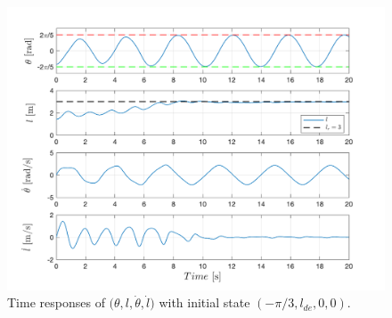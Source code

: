 \documentclass[main.tex]{subfiles}
\begin{document}
\begin{figure}[H]
    \centering
    \includegraphics[scale = 0.6]{figures/Partial_Energy_Shaping/partial_2b.pdf}
    \caption{Time responses of $\big(\theta,l,\dot{\theta},\dot{l}\big)$ with initial state $(-\pi/3,l_{de},0,0)$.} 
    \label{fig:partial_2b}
\end{figure}
\end{document}
